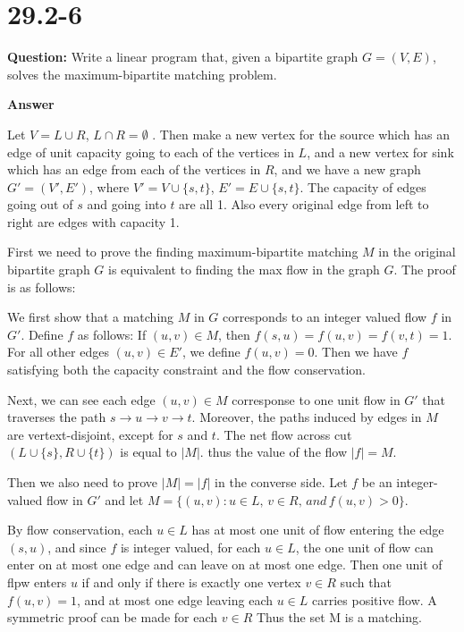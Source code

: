 \documentclass[12pt]{article}
\begin{document}
\section{29.2-6}
\textbf{Question:}
Write a linear program that, given a bipartite graph $G = (V,E)$, solves the maximum-bipartite matching problem.

\textbf{Answer}

Let $V = L \cup R$, $L \cap R = \emptyset$ . Then make a new vertex for the source which has an edge of unit capacity going to each of the vertices in $L$, and a new vertex for sink which has an edge from each of the vertices in $R$, and we have a new graph $G'=(V',E')$, where $V' = V \cup \{s,t\}$, $E' = E \cup \{s, t\}$. The capacity of edges going out of $s$ and going into $t$ are all 1. Also every original edge from left to right are edges with capacity 1.

First we need to prove the finding maximum-bipartite matching $M$ in the original bipartite graph $G$ is equivalent to finding the max flow in the graph $G$. The proof is as follows:

We first show that a matching $M$ in $G$ corresponds to an integer valued flow $f$ in $G'$. Define $f$ as follows: If $(u,v) \in M$, then $f(s,u) = f(u,v) = f(v,t) = 1$. For all other edges $(u,v) \in E'$, we define $f(u,v) = 0$. Then we have $f$ satisfying both the capacity constraint and the flow conservation.

Next, we can see each edge $(u,v) \in M$ corresponse to one unit flow in $G'$ that traverses the path $s \rightarrow u \rightarrow v \rightarrow t$. Moreover, the paths induced by edges in $M$ are vertext-disjoint, except for $s$ and $t$. The net flow across cut $(L \cup \{s\}, R \cup \{t\})$ is equal to $|M|$. thus the value of the flow $|f| = M$. 

Then we also need to prove $|M| = |f|$ in the converse side. Let $f$ be an integer-valued flow in $G'$ and let $M = \{(u,v): u \in L,\, v \in R,\, and\, f(u,v) >0\}$.

By flow conservation, each $u \in L$ has at most one unit of flow entering the edge $(s,u)$, and since $f$ is integer valued, for each $u \in L$, the one unit of flow can enter on at most one edge and can leave on at most one edge. Then one unit of flpw enters $u$ if and only if there is exactly one vertex $v \in R$ such that $f(u,v) = 1$, and at most one edge leaving each $u \in L$ carries positive flow. A symmetric proof can be made for each $v \in R$ Thus the set M is a matching.
\end{document}
